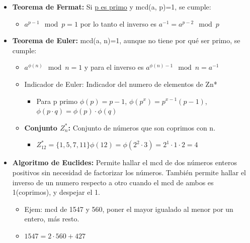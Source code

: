 \documentclass[12pt, twoside, openright]{report} %
\begin{document}
  \begin{itemize}
  \item \textbf{Teorema de Fermat:} Si \underline{p es primo} y mcd(a, p)=1,
    se cumple:
    

    \begin{itemize}
    \item $a^{p-1} \mod p = 1$ por lo tanto el inverso es $a^{-1} = a^{p-2} \mod p$
      
    \end{itemize}
  \item \textbf{Teorema de Euler:} mcd(a, n)=1, aunque no tiene por qué ser
    primo, se cumple:
    

    \begin{itemize}
    \item $a^{\phi(n)} \mod n = 1$ y para el inverso es $a^{\phi(n)-1} \mod n = a^{-1}$
      
    \item Indicador de Euler: Indicador del numero de elementos de Zn*
    \begin{itemize}
		\item Para p primo $\phi(p)=p-1$, $\phi(p^x)=p^{x-1}(p-1)$, $\phi(p\cdot q) = \phi(p)\cdot\phi(q)$
	\end{itemize}
      
    \item \textbf{Conjunto $Z_n^*$:} Conjunto de números que son coprimos con n.
      

      \begin{itemize}
      \item
        
		$Z_{1 2}^* = \{ 1, 5, 7, 11\} \phi(12) = \phi(2^2\cdot 3)=2^1 \cdot 1 \cdot 2 = 4$
        
      \end{itemize}
    \end{itemize}
  \item \textbf{Algoritmo de Euclides:} Permite hallar el mcd de dos números
    enteros positivos sin necesidad de factorizar los números. También
    permite hallar el inverso de un numero respecto a otro cuando el mcd
    de ambos es 1(coprimos), y despejar el 1.
    

    \begin{itemize}
    \item Ejem: mcd de 1547 y 560, poner el mayor igualado al menor por un
      entero, más resto.
      
    \item $1547 = 2 · 560 + 427$
      

\end{itemize}
\end{itemize}
\end{document}
